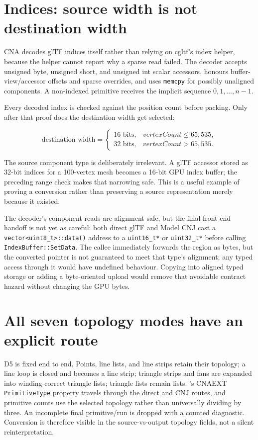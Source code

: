 \section{Indices: source width is not destination width}

CNA decodes glTF indices itself rather than relying on cgltf's index helper, because the helper
cannot report why a sparse read failed. The decoder accepts unsigned byte, unsigned short, and
unsigned int scalar accessors, honours buffer-view/accessor offsets and sparse overrides, and
uses \texttt{memcpy} for possibly unaligned components. A non-indexed primitive receives the
implicit sequence $0,1,\ldots,n-1$.

Every decoded index is checked against the position count before packing. Only after that proof
does the destination width get selected:

\[
  \text{destination width} =
  \begin{cases}
    16\text{ bits}, & vertexCount \le 65{,}535,\\
    32\text{ bits}, & vertexCount > 65{,}535.
  \end{cases}
\]

The source component type is deliberately irrelevant. A glTF accessor stored as 32-bit indices
for a 100-vertex mesh becomes a 16-bit GPU index buffer; the preceding range check makes that
narrowing safe. This is a useful example of proving a conversion rather than preserving a
source representation merely because it existed.

The decoder's component reads are alignment-safe, but the final front-end handoff is not yet as
careful: both direct glTF and Model CNJ cast a \texttt{vector<uint8\_t>::data()} address to a
\texttt{uint16\_t*} or \texttt{uint32\_t*} before calling \texttt{IndexBuffer::SetData}. The
callee immediately forwards the region as bytes, but the converted pointer is not guaranteed to
meet that type's alignment; any typed access through it would have undefined behaviour. Copying
into aligned typed storage or adding a byte-oriented upload would remove that avoidable contract
hazard without changing the GPU bytes.

\section{All seven topology modes have an explicit route}

D5 is fixed end to end. Points, line lists, and line strips retain their topology; a line loop is
closed and becomes a line strip; triangle strips and fans are expanded into winding-correct
triangle lists; triangle lists remain lists. 's CNAEXT
\texttt{PrimitiveType} property travels through the direct and CNJ routes, and primitive counts
use the selected topology rather than universally dividing by three. An incomplete final
primitive/run is dropped with a counted diagnostic. Conversion is therefore visible in the
source-vs-output topology fields, not a silent reinterpretation.


